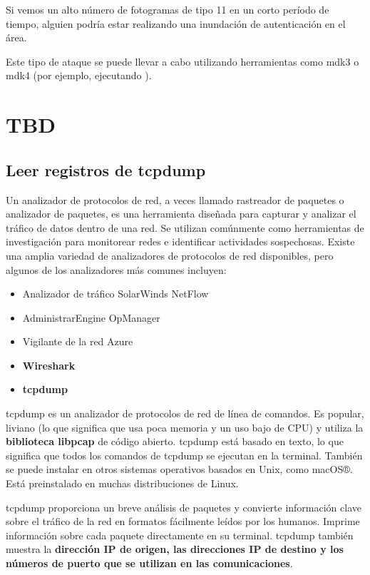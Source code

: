 Si vemos un alto número de fotogramas de tipo 11 en un corto período de tiempo, alguien podría estar realizando una inundación de autenticación en el área.

Este tipo de ataque se puede llevar a cabo utilizando herramientas como mdk3 o mdk4 (por ejemplo, ejecutando ).



\section{TBD}
\subsection{Leer registros de tcpdump}
Un analizador de protocolos de red, a veces llamado rastreador de paquetes o analizador de paquetes, es una herramienta diseñada para capturar y analizar el tráfico de datos dentro de una red. Se utilizan comúnmente como herramientas de investigación para monitorear redes e identificar actividades sospechosas. Existe una amplia variedad de analizadores de protocolos de red disponibles, pero algunos de los analizadores más comunes incluyen:
\begin{itemize}
    \item Analizador de tráfico SolarWinds NetFlow

    \item AdministrarEngine OpManager

    \item Vigilante de la red Azure

    \item \textbf{Wireshark}

    \item \textbf{tcpdump}

\end{itemize}


tcpdump es un analizador de protocolos de red de línea de comandos. Es popular, liviano (lo que significa que usa poca memoria y un uso bajo de CPU) y utiliza la \textbf{biblioteca libpcap} de código abierto. tcpdump está basado en texto, lo que significa que todos los comandos de tcpdump se ejecutan en la terminal. También se puede instalar en otros sistemas operativos basados en Unix, como macOS®. Está preinstalado en muchas distribuciones de Linux.

tcpdump proporciona un breve análisis de paquetes y convierte información clave sobre el tráfico de la red en formatos fácilmente leídos por los humanos. Imprime información sobre cada paquete directamente en su terminal. tcpdump también muestra la \textbf{dirección IP de origen, las direcciones IP de destino y los números de puerto que se utilizan en las comunicaciones}.


